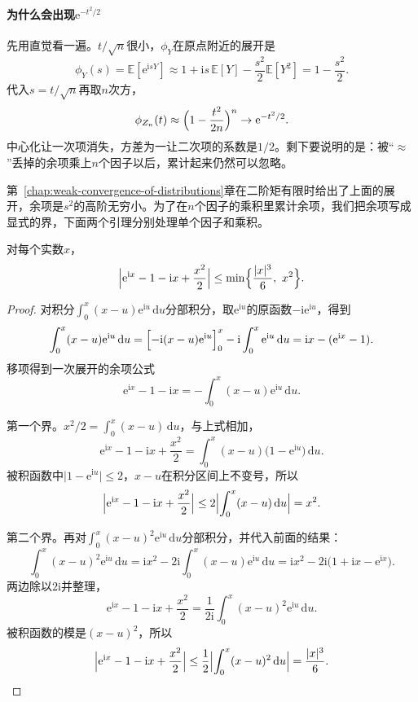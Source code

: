 \paragraph{为什么会出现$\mathrm{e}^{-t^2/2}$}
先用直觉看一遍。$t/\sqrt{n}$很小，$\phi_Y$在原点附近的展开是
\[
 \phi_Y(s)=\mathbb{E}[\mathrm{e}^{\mathrm{i}sY}]\approx1+\mathrm{i}s\,\mathbb{E}[Y]-\frac{s^2}{2}\mathbb{E}[Y^2]=1-\frac{s^2}{2} .
\]
代入$s=t/\sqrt{n}$再取$n$次方，
\[
 \phi_{Z_n}(t)\approx\Bigl(1-\frac{t^2}{2n}\Bigr)^{n}\to\mathrm{e}^{-t^2/2} .
\]
中心化让一次项消失，方差为一让二次项的系数是$1/2$。剩下要说明的是：被“$\approx$”丢掉的余项乘上$n$个因子以后，累计起来仍然可以忽略。

第~\ref{chap:weak-convergence-of-distributions}章在二阶矩有限时给出了上面的展开，余项是$s^2$的高阶无穷小。为了在$n$个因子的乘积里累计余项，我们把余项写成显式的界，下面两个引理分别处理单个因子和乘积。

\begin{lemma}[复指数的二阶展开]
\label{lem:clt-exp-remainder}
对每个实数$x$，
\begin{equation}
 \Bigl\lvert\mathrm{e}^{\mathrm{i}x}-1-\mathrm{i}x+\frac{x^2}{2}\Bigr\rvert\leq\min\Bigl\{\frac{\lvert x\rvert^{3}}{6},\ x^2\Bigr\} .
 \label{eq:clt-exp-remainder}
\end{equation}
\end{lemma}

\begin{proof}
对积分$\int_0^x(x-u)\mathrm{e}^{\mathrm{i}u}\,\mathrm{d}u$分部积分，取$\mathrm{e}^{\mathrm{i}u}$的原函数$-\mathrm{i}\mathrm{e}^{\mathrm{i}u}$，得到
\[
 \int_0^x(x-u)\mathrm{e}^{\mathrm{i}u}\,\mathrm{d}u
 =\Bigl[-\mathrm{i}(x-u)\mathrm{e}^{\mathrm{i}u}\Bigr]_0^x-\mathrm{i}\int_0^x\mathrm{e}^{\mathrm{i}u}\,\mathrm{d}u
 =\mathrm{i}x-(\mathrm{e}^{\mathrm{i}x}-1) .
\]
移项得到一次展开的余项公式
\[
 \mathrm{e}^{\mathrm{i}x}-1-\mathrm{i}x=-\int_0^x(x-u)\mathrm{e}^{\mathrm{i}u}\,\mathrm{d}u .
\]

第一个界。$x^2/2=\int_0^x(x-u)\,\mathrm{d}u$，与上式相加，
\[
 \mathrm{e}^{\mathrm{i}x}-1-\mathrm{i}x+\frac{x^2}{2}=\int_0^x(x-u)\bigl(1-\mathrm{e}^{\mathrm{i}u}\bigr)\,\mathrm{d}u .
\]
被积函数中$\lvert1-\mathrm{e}^{\mathrm{i}u}\rvert\leq2$，$x-u$在积分区间上不变号，所以
\[
 \Bigl\lvert\mathrm{e}^{\mathrm{i}x}-1-\mathrm{i}x+\frac{x^2}{2}\Bigr\rvert\leq2\Bigl\lvert\int_0^x(x-u)\,\mathrm{d}u\Bigr\rvert=x^2 .
\]

第二个界。再对$\int_0^x(x-u)^2\mathrm{e}^{\mathrm{i}u}\,\mathrm{d}u$分部积分，并代入前面的结果：
\[
 \int_0^x(x-u)^2\mathrm{e}^{\mathrm{i}u}\,\mathrm{d}u
 =\mathrm{i}x^2-2\mathrm{i}\int_0^x(x-u)\mathrm{e}^{\mathrm{i}u}\,\mathrm{d}u
 =\mathrm{i}x^2-2\mathrm{i}\bigl(1+\mathrm{i}x-\mathrm{e}^{\mathrm{i}x}\bigr) .
\]
两边除以$2\mathrm{i}$并整理，
\[
 \mathrm{e}^{\mathrm{i}x}-1-\mathrm{i}x+\frac{x^2}{2}=\frac{1}{2\mathrm{i}}\int_0^x(x-u)^2\mathrm{e}^{\mathrm{i}u}\,\mathrm{d}u .
\]
被积函数的模是$(x-u)^2$，所以
\[
 \Bigl\lvert\mathrm{e}^{\mathrm{i}x}-1-\mathrm{i}x+\frac{x^2}{2}\Bigr\rvert\leq\frac12\Bigl\lvert\int_0^x(x-u)^2\,\mathrm{d}u\Bigr\rvert=\frac{\lvert x\rvert^3}{6} .
\]
\end{proof}

